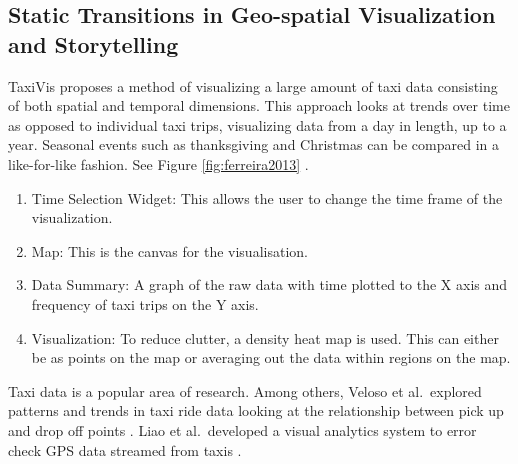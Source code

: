 \documentclass{egpubl}
\begin{document}
\subsection{Static Transitions in Geo-spatial Visualization and Storytelling}
TaxiVis proposes a method of visualizing a large amount of taxi data consisting of both spatial and temporal dimensions. This approach looks at trends over time as opposed to individual taxi trips, visualizing data from a day in length, up to a year. Seasonal events such as thanksgiving and Christmas can be compared in a like-for-like fashion. See Figure \ref{fig:ferreira2013} \cite{ferreira2013}.
\begin{enumerate}
\item Time Selection Widget: This allows the user to change the time frame of the visualization. 
\item Map: This is the canvas for the visualisation.
\item Data Summary: A graph of the raw data with time plotted to the X axis and frequency of taxi trips on the Y axis.
\item Visualization: To reduce clutter, a density heat map is used. This can either be as points on the map or averaging out the data within regions on the map. 
\end{enumerate}
Taxi data is a popular area of research. Among others, Veloso et al.\ explored patterns and trends in taxi ride data looking at the relationship between pick up and drop off points \cite{veloso2011,Veloso}. Liao et al.\ developed a visual analytics system to error check GPS data streamed from taxis \cite{liao2010}. 
\end{document}
